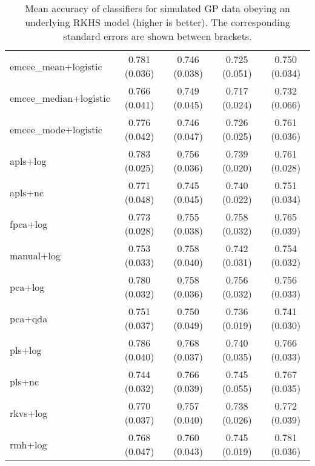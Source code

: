 \begin{table}[htbp!]
\begin{tabular}{lcccc}
  emcee\_mean+logistic & 0.781 (0.036) &       0.746 (0.038) &      0.725 (0.051) & 0.750 (0.034) \\
emcee\_median+logistic & 0.766 (0.041) &       0.749 (0.045) &      0.717 (0.024) & 0.732 (0.066) \\
  emcee\_mode+logistic & 0.776 (0.042) &       0.746 (0.047) &      0.726 (0.025) & 0.761 (0.036) \\
             apls+log & 0.783 (0.025) &       0.756 (0.036) &      0.739 (0.020) & 0.761 (0.028) \\
              apls+nc & 0.771 (0.048) &       0.745 (0.045) &      0.740 (0.022) & 0.751 (0.034) \\
             fpca+log & 0.773 (0.028) &       0.755 (0.038) &      0.758 (0.032) & 0.765 (0.039) \\
           manual+log & 0.753 (0.033) &       0.758 (0.040) &      0.742 (0.031) & 0.754 (0.032) \\
              pca+log & 0.780 (0.032) &       0.758 (0.036) &      0.756 (0.032) & 0.756 (0.033) \\
              pca+qda & 0.751 (0.037) &       0.750 (0.049) &      0.736 (0.019) & 0.741 (0.030) \\
              pls+log & 0.786 (0.040) &       0.768 (0.037) &      0.740 (0.035) & 0.766 (0.033) \\
               pls+nc & 0.744 (0.032) &       0.766 (0.039) &      0.745 (0.055) & 0.767 (0.035) \\
             rkvs+log & 0.770 (0.037) &       0.757 (0.040) &      0.738 (0.026) & 0.772 (0.039) \\
              rmh+log & 0.768 (0.047) &       0.760 (0.043) &      0.745 (0.019) & 0.781 (0.036) \\
\bottomrule
\end{tabular}
  \caption{Mean accuracy of classifiers for simulated GP data obeying an underlying RKHS model (higher is better). The corresponding standard errors are shown between brackets.}
\end{table}

\newpage

